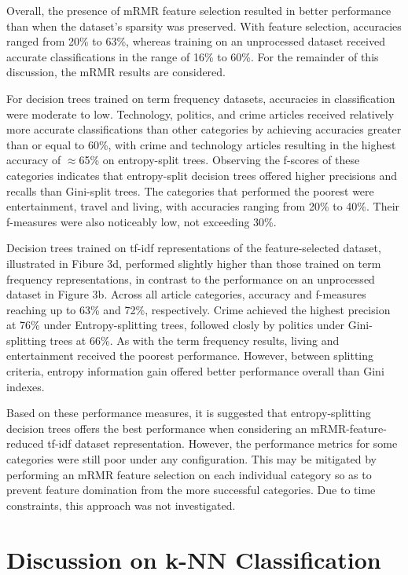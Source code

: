 \documentclass[11pt]{article}
\begin{document}
Overall, the presence of mRMR feature selection resulted in better performance than when the dataset's sparsity was preserved.
With feature selection, accuracies ranged from 20\% to 63\%, whereas training on an unprocessed dataset received accurate classifications in the range of 16\% to 60\%.
For the remainder of this discussion, the mRMR results are considered.

For decision trees trained on term frequency datasets, accuracies in classification were moderate to low.
Technology, politics, and crime articles received relatively more accurate classifications than other categories by achieving accuracies greater than or equal to 60\%, with crime and technology articles resulting in the highest accuracy of $\approx$65\% on entropy-split trees.
Observing the f-scores of these categories indicates that entropy-split decision trees offered higher precisions and recalls than Gini-split trees.
The categories that performed the poorest were entertainment, travel and living, with accuracies ranging from 20\% to 40\%.
Their f-measures were also noticeably low, not exceeding 30\%.

Decision trees trained on tf-idf representations of the feature-selected dataset, illustrated in Fibure 3d, performed slightly higher than those trained on term frequency representations, in contrast to the performance on an unprocessed dataset in Figure 3b.
Across all article categories, accuracy and f-measures reaching up to 63\% and 72\%, respectively.
Crime achieved the highest precision at 76\% under Entropy-splitting trees, followed closly by politics under Gini-splitting trees at 66\%.
As with the term frequency results, living and entertainment received the poorest performance.
However, between splitting criteria, entropy information gain offered better performance overall than Gini indexes.

Based on these performance measures, it is suggested that entropy-splitting decision trees offers the best performance when considering an mRMR-feature-reduced tf-idf dataset representation.
However, the performance metrics for some categories were still poor under any configuration.
This may be mitigated by performing an mRMR feature selection on each individual category so as to prevent feature domination from the more successful categories.
Due to time constraints, this approach was not investigated.

\section{Discussion on k-NN Classification} \label{sec:knn}
\end{document}
